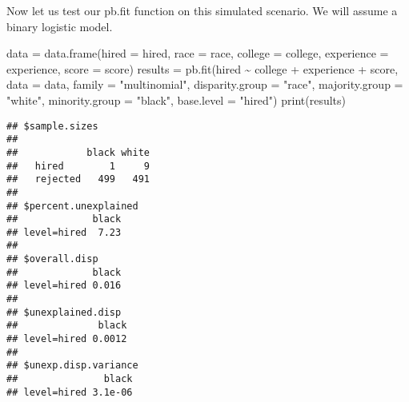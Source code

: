 \documentclass[
]{article}
\newenvironment{Shaded}{\begin{snugshade}}{\end{snugshade}}
\newcommand{\AttributeTok}[1]{\textcolor[rgb]{0.77,0.63,0.00}{#1}}
\newcommand{\FunctionTok}[1]{\textcolor[rgb]{0.00,0.00,0.00}{#1}}
\newcommand{\NormalTok}[1]{#1}
\newcommand{\OtherTok}[1]{\textcolor[rgb]{0.56,0.35,0.01}{#1}}
\newcommand{\SpecialCharTok}[1]{\textcolor[rgb]{0.00,0.00,0.00}{#1}}
\newcommand{\StringTok}[1]{\textcolor[rgb]{0.31,0.60,0.02}{#1}}
\begin{document}
Now let us test our pb.fit function on this simulated scenario. We will
assume a binary logistic model.

\begin{Shaded}
\begin{Highlighting}[]
\NormalTok{data }\OtherTok{=} \FunctionTok{data.frame}\NormalTok{(}\AttributeTok{hired =}\NormalTok{ hired,}
                  \AttributeTok{race =}\NormalTok{ race,}
                  \AttributeTok{college =}\NormalTok{ college,}
                  \AttributeTok{experience =}\NormalTok{ experience,}
                  \AttributeTok{score =}\NormalTok{ score)}
\NormalTok{results }\OtherTok{=} \FunctionTok{pb.fit}\NormalTok{(hired }\SpecialCharTok{\textasciitilde{}}\NormalTok{ college }\SpecialCharTok{+}\NormalTok{ experience }\SpecialCharTok{+}\NormalTok{ score,}
                 \AttributeTok{data =}\NormalTok{ data,}
                 \AttributeTok{family =} \StringTok{"multinomial"}\NormalTok{,}
                 \AttributeTok{disparity.group =} \StringTok{"race"}\NormalTok{,}
                 \AttributeTok{majority.group =} \StringTok{"white"}\NormalTok{,}
                 \AttributeTok{minority.group =} \StringTok{"black"}\NormalTok{,}
                 \AttributeTok{base.level =} \StringTok{"hired"}\NormalTok{)}
\FunctionTok{print}\NormalTok{(results)}
\end{Highlighting}
\end{Shaded}

\begin{verbatim}
## $sample.sizes
##           
##            black white
##   hired        1     9
##   rejected   499   491
## 
## $percent.unexplained
##             black
## level=hired  7.23
## 
## $overall.disp
##             black
## level=hired 0.016
## 
## $unexplained.disp
##              black
## level=hired 0.0012
## 
## $unexp.disp.variance
##               black
## level=hired 3.1e-06
\end{verbatim}
\end{document}
